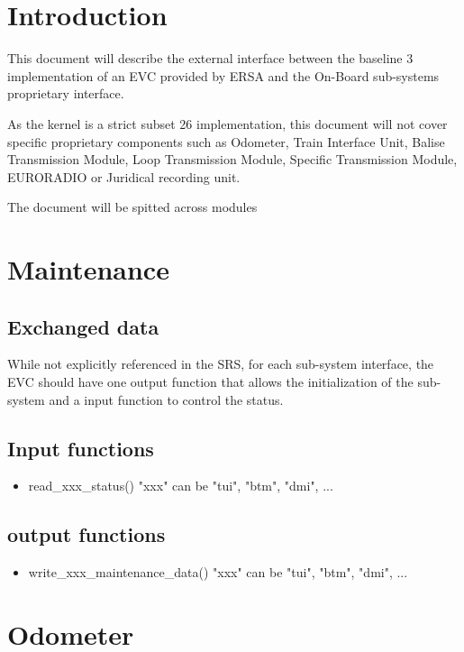 \documentclass{template/openetcs_article}
\begin{document}


\section{Introduction}

This document will describe the external interface between the baseline 3 implementation of an EVC provided by ERSA and the On-Board sub-systems proprietary interface.

As the kernel is a strict subset 26 implementation, this document will not cover specific proprietary components such as Odometer, Train Interface Unit, Balise Transmission Module, Loop Transmission Module, Specific Transmission Module, EURORADIO or Juridical recording unit.

The document will be spitted across modules 

\section{Maintenance}
	\subsection{Exchanged data}
		While not explicitly referenced in the SRS, for each sub-system interface, the EVC should have one output function that allows the initialization of the sub-system and a input function to control the status.
	\subsection{Input functions}
		\begin{itemize}
			\item read\_xxx\_status()
				\subitem "xxx" can be "tui", "btm", "dmi", ...
		\end{itemize}
	\subsection{output functions}
		\begin{itemize}
			\item write\_xxx\_maintenance\_data()
				\subitem "xxx" can be "tui", "btm", "dmi", ...
		\end{itemize}
\section{Odometer}
\end{document}
